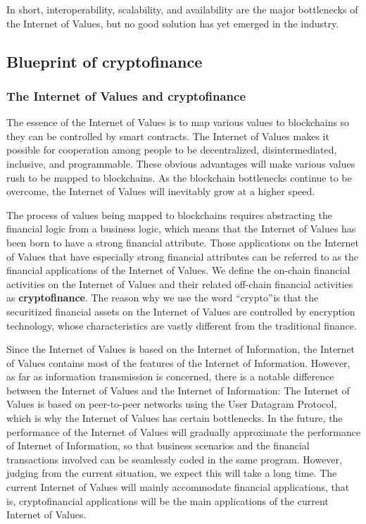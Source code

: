 \documentclass[a4paper,12pt]{article}
\begin{document}
In short, interoperability, scalability, and availability are the major bottlenecks of the Internet of Values, but no good solution has yet emerged in the industry.

\subsection{Blueprint of cryptofinance}

\subsubsection{The Internet of Values and cryptofinance}

The essence of the Internet of Values is to map various values to blockchains so they can be controlled by smart contracts. The Internet of Values makes it possible for cooperation among people to be decentralized, disintermediated, inclusive, and programmable. These obvious advantages will make various values rush to be mapped to blockchains. As the blockchain bottlenecks continue to be overcome, the Internet of Values will inevitably grow at a higher speed.

The process of values being mapped to blockchains requires abstracting the financial logic from a business logic, which means that the Internet of Values has been born to have a strong financial attribute. Those applications on the Internet of Values that have especially strong financial attributes can be referred to as the financial applications of the Internet of Values. We define the on-chain financial activities on the Internet of Values and their related off-chain financial activities as \textbf{cryptofinance}. The reason why we use the word “crypto” is that the securitized financial assets on the Internet of Values are controlled by encryption technology, whose characteristics are vastly different from the traditional finance.

Since the Internet of Values is based on the Internet of Information, the Internet of Values contains most of the features of the Internet of Information. However, as far as information transmission is concerned, there is a notable difference between the Internet of Values and the Internet of Information: The Internet of Values is based on peer-to-peer networks using the User Datagram Protocol, which is why the Internet of Values has certain bottlenecks. In the future, the performance of the Internet of Values will gradually approximate the performance of Internet of Information, so that business scenarios and the financial transactions involved can be seamlessly coded in the same program. However, judging from the current situation, we expect this will take a long time. The current Internet of Values will mainly accommodate financial applications, that is, cryptofinancial applications will be the main applications of the current Internet of Values.
\end{document}
